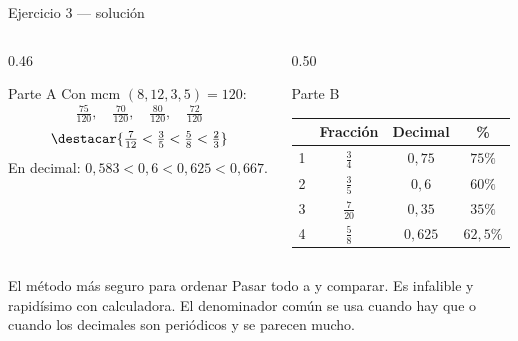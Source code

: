 \documentclass[aspectratio=169,10pt]{beamer}
\begin{document}
\begin{frame}{Ejercicio 3 — solución}
  \scriptsize
  \begin{columns}[T,onlytextwidth]
    \begin{column}{0.46\textwidth}
      \begin{block}{Parte A}
        \tiny
        Con mcm $(8,12,3,5) = 120$:
        \[ \tfrac{75}{120},\quad \tfrac{70}{120},\quad \tfrac{80}{120},
           \quad \tfrac{72}{120} \]
        \[ \destacar{\tfrac{7}{12} < \tfrac{3}{5} < \tfrac{5}{8}
           < \tfrac{2}{3}} \]
        En decimal: $0{,}583 < 0{,}6 < 0{,}625 < 0{,}667$.
      \end{block}
    \end{column}
    \begin{column}{0.50\textwidth}
      \begin{block}{Parte B}
        \tiny
        \begin{tabular}{@{}lccc@{}}
          \toprule
          & \textbf{Fracción} & \textbf{Decimal} & \textbf{\%} \\
          \midrule
          1 & $\tfrac{3}{4}$ & $0{,}75$  & $75\%$ \\[0.3em]
          2 & $\tfrac{3}{5}$ & $0{,}6$   & $60\%$ \\[0.3em]
          3 & $\tfrac{7}{20}$& $0{,}35$  & $35\%$ \\[0.3em]
          4 & $\tfrac{5}{8}$ & $0{,}625$ & $62{,}5\%$ \\
          \bottomrule
        \end{tabular}
      \end{block}
    \end{column}
  \end{columns}

  \vspace{0.08cm}
  \begin{alertblock}{El método más seguro para ordenar}
    \tiny
    Pasar todo a  y comparar. Es infalible y rapidísimo con
    calculadora. El denominador común se usa cuando hay que  o cuando los decimales son periódicos y se parecen mucho.
  \end{alertblock}
\end{frame}
\end{document}
